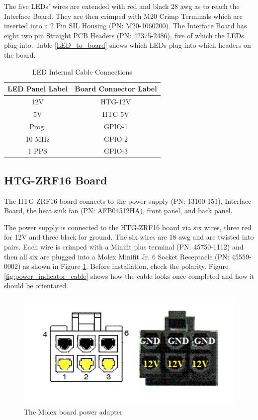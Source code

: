 \documentclass[12pt,a4paper,oneside]{article}
\begin{document}
The five LEDs' wires are extended with red and black 28 awg as to reach the Interface Board. They are then crimped with M20 Crimp Terminals which are inserted into a 2 Pin SIL Housing (PN: M20-1060200). The Interface Board has eight two pin Straight PCB Headers (PN: 42375-2486), five of which the LEDs plug into. Table \ref{LED_to_board} shows which LEDs plug into which headers on the board. 

\begin{table}[H]
\caption{LED Internal Cable Connections}
\centering
\label{LED_to_board}
\begin{tabular}{@{}cc@{}}
\toprule
 LED Panel Label & Board Connector Label\\ 
\midrule
12V & HTG-12V\\
5V & HTG-5V\\
Prog. & GPIO-1\\
10 MHz & GPIO-2\\
1 PPS & GPIO-3\\

\bottomrule            
\end{tabular}
\label{table:LED_to_board}
\end{table}


\subsection{HTG-ZRF16 Board}
\label{sec:6.3}

The HTG-ZRF16 board connects to the power supply (PN: 13100-151), Interface Board, the heat sink fan (PN: AFB04512HA), front panel, and back panel.

The power supply is connected to the HTG-ZRF16 board via six wires, three red for 12V and three black for ground. The six wires are 18 awg and are twisted into pairs. Each wire is crimped with a Minifit plus terminal (PN: 45750-1112) and then all six are plugged into a Molex Minifit Jr. 6 Socket Receptacle (PN: 45559-0002) as shown in Figure \ref{fig:board-power}. Before installation, check the polarity. Figure \ref{fig:power_indicator_cable} shows how the cable looks once completed and how it should be orientated. 


\begin{figure}[H]
\centering
\includegraphics[width=1\linewidth]{figures/6pin 12V.png}
\caption{The Molex board power adapter}
\label{fig:board-power}
\end{figure}
\end{document}
